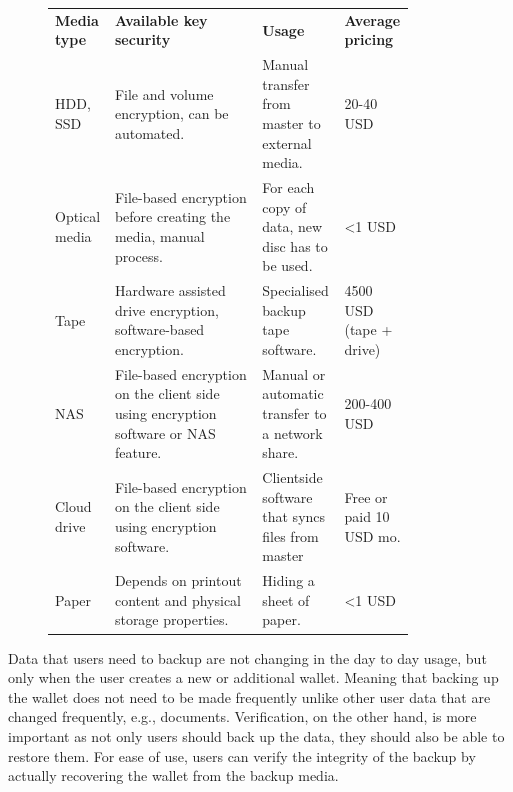 \documentclass[
  printed, %
  table,   %
  lof,     %
  lot,     %
           oneside, color
]{fithesis3}
\begin{document}
\begin{figure}[H]
\centering
\begin{tabular}{p{0.1\linewidth}p{0.4\linewidth}p{0.20\linewidth}p{0.15\linewidth}}
\textbf{Media type} & \textbf{Available key security}                                    & \textbf{Usage}                                   & \textbf{Average pricing}      \\
HDD, SSD            & File and volume encryption, can be automated.                       & Manual transfer from master to external media.    & 20-40 USD                              \\
Optical media       & File-based encryption before creating the media, manual process.            & For each copy of data, new disc has to be used.   & \textless{}1 USD                       \\
Tape                & Hardware assisted drive encryption, software-based encryption.       & Specialised backup tape software.                & 4500 USD (tape + drive) \\
NAS                 & File-based encryption on the client side using encryption software or NAS feature. & Manual or automatic transfer to a network share.    & 200-400 USD                            \\
Cloud drive       & File-based encryption on the client side using encryption software. & Clientside software that syncs files from master & Free or paid 10 USD mo.                      \\
Paper               & Depends on printout content and physical storage properties.        & Hiding a sheet of paper.                          & \textless{}1 USD                       \\

\end{tabular}


\label{table:secure-storage}
\end{figure}

Data that users need to backup are not changing in the day to day usage, but only when the user creates a new or additional wallet. Meaning that backing up the wallet does not need to be made frequently unlike other user data that are changed frequently, e.g., documents. Verification, on the other hand, is more important as not only users should back up the data, they should also be able to restore them. For ease of use, users can verify the integrity of the backup by actually recovering the wallet from the backup media.
\end{document}
